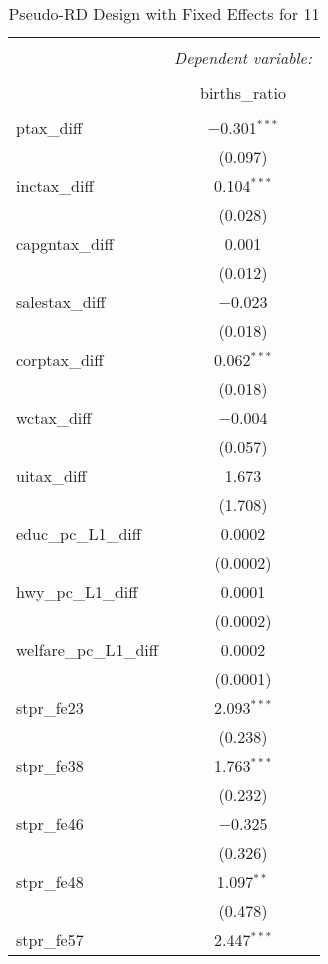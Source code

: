 
\begin{table}[!htbp] \centering 
  \caption{Pseudo-RD Design with Fixed Effects for  11} 
  \label{} 
\begin{tabular}{@{\extracolsep{5pt}}lc} 
\\[-1.8ex]\hline 
\hline \\[-1.8ex] 
 & \multicolumn{1}{c}{\textit{Dependent variable:}} \\ 
\cline{2-2} 
\\[-1.8ex] & births\_ratio \\ 
\hline \\[-1.8ex] 
 ptax\_diff & $-$0.301$^{***}$ \\ 
  & (0.097) \\ 
  inctax\_diff & 0.104$^{***}$ \\ 
  & (0.028) \\ 
  capgntax\_diff & 0.001 \\ 
  & (0.012) \\ 
  salestax\_diff & $-$0.023 \\ 
  & (0.018) \\ 
  corptax\_diff & 0.062$^{***}$ \\ 
  & (0.018) \\ 
  wctax\_diff & $-$0.004 \\ 
  & (0.057) \\ 
  uitax\_diff & 1.673 \\ 
  & (1.708) \\ 
  educ\_pc\_L1\_diff & 0.0002 \\ 
  & (0.0002) \\ 
  hwy\_pc\_L1\_diff & 0.0001 \\ 
  & (0.0002) \\ 
  welfare\_pc\_L1\_diff & 0.0002 \\ 
  & (0.0001) \\ 
  stpr\_fe23 & 2.093$^{***}$ \\ 
  & (0.238) \\ 
  stpr\_fe38 & 1.763$^{***}$ \\ 
  & (0.232) \\ 
  stpr\_fe46 & $-$0.325 \\ 
  & (0.326) \\ 
  stpr\_fe48 & 1.097$^{**}$ \\ 
  & (0.478) \\ 
  stpr\_fe57 & 2.447$^{***}$ \\ 

\end{tabular}
\end{table}
